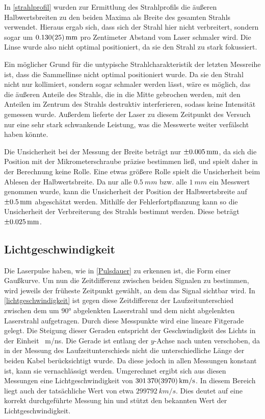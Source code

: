 \documentclass[
	a4paper,
	12pt,
	pagesize,
	ngerman
]{scrartcl}
\begin{document}
In \cref{strahlprofil} wurden zur Ermittlung des Strahlprofils die äußeren Halbwertsbreiten zu den beiden Maxima als Breite des gesamten Strahls verwendet. Hieraus ergab sich, dass sich der Strahl hier nicht verbreitert, sondern sogar um $\SI{0,130\pm0,025}{mm}$ pro Zentimeter Abstand vom Laser schmaler wird. Die Linse wurde also nicht optimal positioniert, da sie den Strahl zu stark fokussiert.

Ein möglicher Grund für die untypische Strahlcharakteristik der letzten Messreihe ist, dass die Sammellinse nicht optimal positioniert wurde. Da sie den Strahl nicht nur kollimiert, sondern sogar schmaler werden lässt, wäre es möglich, das die äußeren Anteile des Strahls, die in die Mitte gebrochen werden, mit den Anteilen im Zentrum des Strahls destruktiv interferieren, sodass keine Intensität gemessen wurde. Außerdem lieferte der Laser zu diesem Zeitpunkt des Versuch nur eine sehr stark schwankende Leistung, was die Messwerte weiter verfälscht haben könnte.

Die Unsicherheit bei der Messung der Breite beträgt nur $\SI{\pm0,005}{mm}$, da sich die Position mit der Mikrometerschraube präzise bestimmen ließ, und spielt daher in der Berechnung keine Rolle. Eine etwas größere Rolle spielt die Unsicherheit beim Ablesen der Halbwertsbreite. Da nur alle $\SI{0,5}{mm}$ bzw. alle $\SI{1}{mm}$ ein Messwert genommen wurde, kann die Unsicherheit der Position der Halbwertsbreite auf $\SI{\pm0,5}{mm}$ abgeschätzt werden. Mithilfe der Fehlerfortpflanzung kann so die Unsicherheit der Verbreiterung des Strahls bestimmt werden. Diese beträgt $\SI{\pm0,025}{mm}$.

\subsection{Lichtgeschwindigkeit}
Die Laserpulse haben, wie in \cref{Pulsdauer} zu erkennen ist, die Form einer Gaußkurve. Um nun die Zeitdifferenz zwischen beiden Signalen zu bestimmen, wird jeweils der früheste Zeitpunkt gewählt, an dem das Signal sichtbar wird. In \cref{lichtgeschwindigkeit} ist gegen diese Zeitdifferenz der Laufzeitunterschied zwischen dem um $90$° abgelenkten Laserstrahl und dem nicht abgelenkten Laserstrahl aufgetragen. Durch diese Messpunkte wird eine lineare Fitgerade gelegt. Die Steigung dieser Geraden entspricht der Geschwindigkeit des Lichts in der Einheit \SI{}{m/ns}. Die Gerade ist entlang der $y$-Achse nach unten verschoben, da in der Messung des Laufzeitunterschieds nicht die unterschiedliche Länge der beiden Kabel berücksichtigt wurde. Da diese jedoch in allen Messungen konstant ist, kann sie vernachlässigt werden. Umgerechnet ergibt sich aus diesen Messungen eine Lichtgeschwindigkeit von $\SI{301370\pm3970}{km/s}$. In diesem Bereich liegt auch der tatsächliche Wert von etwa $\SI{299 792}{km/s}$. Dies deutet auf eine korrekt durchgeführte Messung hin und stützt den bekannten Wert der Lichtgeschwindigkeit.
\end{document}
